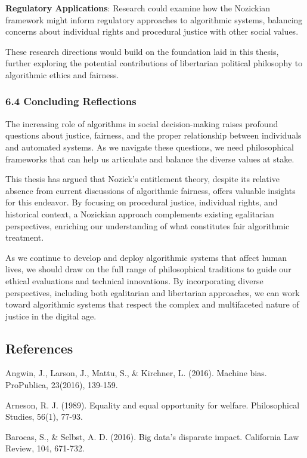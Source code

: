 \textbf{Regulatory Applications}: Research could examine how the
Nozickian framework might inform regulatory approaches to algorithmic
systems, balancing concerns about individual rights and procedural
justice with other social values.

These research directions would build on the foundation laid in this
thesis, further exploring the potential contributions of libertarian
political philosophy to algorithmic ethics and fairness.

\subsubsection{6.4 Concluding Reflections}\label{concluding-reflections}

The increasing role of algorithms in social decision-making raises
profound questions about justice, fairness, and the proper relationship
between individuals and automated systems. As we navigate these
questions, we need philosophical frameworks that can help us articulate
and balance the diverse values at stake.

This thesis has argued that Nozick's entitlement theory, despite its
relative absence from current discussions of algorithmic fairness,
offers valuable insights for this endeavor. By focusing on procedural
justice, individual rights, and historical context, a Nozickian approach
complements existing egalitarian perspectives, enriching our
understanding of what constitutes fair algorithmic treatment.

As we continue to develop and deploy algorithmic systems that affect
human lives, we should draw on the full range of philosophical
traditions to guide our ethical evaluations and technical innovations.
By incorporating diverse perspectives, including both egalitarian and
libertarian approaches, we can work toward algorithmic systems that
respect the complex and multifaceted nature of justice in the digital
age.

\subsection{References}\label{references}

Angwin, J., Larson, J., Mattu, S., \& Kirchner, L. (2016). Machine bias.
ProPublica, 23(2016), 139-159.

Arneson, R. J. (1989). Equality and equal opportunity for welfare.
Philosophical Studies, 56(1), 77-93.

Barocas, S., \& Selbst, A. D. (2016). Big data's disparate impact.
California Law Review, 104, 671-732.


